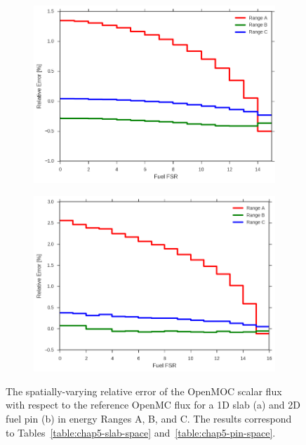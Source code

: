 \begin{figure}[H]
\begin{subfigure}{\textwidth}
  \centering
  \includegraphics[width=0.8\linewidth]{figures/biases/slab/rel-err-fuel-fsrs}
  \caption{}
\end{subfigure}
\begin{subfigure}{\textwidth}
  \centering
  \includegraphics[width=0.8\linewidth]{figures/biases/pin-cell/rel-err-fuel-fsrs}
  \caption{}
\end{subfigure}
\caption[Flux relative error by FSR]{The spatially-varying relative error of the OpenMOC scalar flux with respect to the reference OpenMC flux for a 1D slab (a) and 2D fuel pin (b) in energy Ranges A, B, and C. The results correspond to Tables~\ref{table:chap5-slab-space} and~\ref{table:chap5-pin-space}.}
\label{fig:chap5-rel-err-space}
\end{figure}

